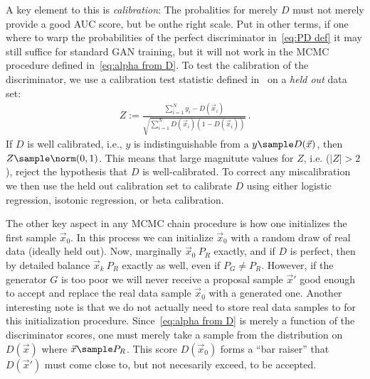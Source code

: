 A key element to this is \emph{calibration}: The probalities for merely $D$ must not merely provide a good AUC score, but be onthe right scale.
Put in other terms, if one where to warp the probabilities of the perfect discriminator in~\eqref{eq:PD def} it may still suffice for standard GAN training, but it will not work in the MCMC procedure defined in~\eqref{eq:alpha from D}.
To test the calibration of the discriminator, we use a calibration test statistic defined in~\citet{} on a \emph{held out} data set:  %
\begin{align}
  Z := \frac{\sum_{i=1}^N y_i - D(\vec x_i)}{\sqrt{\sum_{i=1}^N D(\vec x_i) (1 - D(\vec x_i))}}\,.
\end{align}
If $D$ is well calibrated, i.e., $y$ is indistinguishable from a $y \sample D(\vec x)$, then $Z \sample \norm(0,1)$.
This means that large magnitute values for $Z$, i.e. ($|Z| > 2$), reject the hypothesis that $D$ is well-calibrated.
To correct any miscalibration we then use the held out calibration set to calibrate $D$ using either logistic regression, isotonic regression, or beta calibration.

The other key aspect in any MCMC chain procedure is how one initializes the first sample $\vec x_0$.
In this process we can initialize $\vec x_0$ with a random draw of real data (ideally held out)\@.
Now, marginally $\vec x_0 ~ P_R$ exactly, and if $D$ is perfect, then by detailed balance $\vec x_k ~ P_R$ exactly as well, even if $P_G \neq P_R$.
However, if the generator $G$ is too poor we will never receive a proposal sample $\vec x'$ good enough to accept and replace the real data sample $\vec x_0$ with a generated one.
Another interesting note is that we do not actually need to store real data samples to for this initialization procedure.
Since~\eqref{eq:alpha from D} is merely a function of the discriminator scores, one must merely take a sample from the distribution on $D(\vec x)$ where $\vec x \sample P_R$.
This score $D(\vec x_0)$ forms a ``bar raiser'' that $D(\vec x')$ must come close to, but not necesarily exceed, to be accepted.


